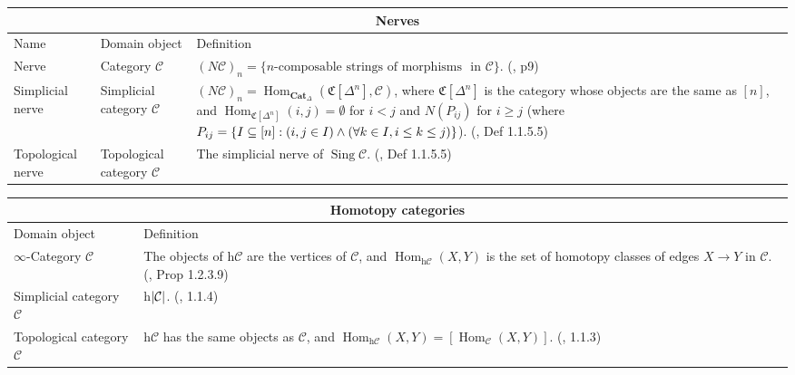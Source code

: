 \documentclass{article}
\DeclareMathOperator{\Hom}{Hom}
\DeclareMathOperator{\Sing}{Sing}
\def\subq{\ensuremath\subseteq}
\begin{document}
\begin{centre}
\begin{tabular}{ |p{3cm}||p{5cm}|p{7cm}|}
 \hline
 \multicolumn{3}{|c|}{Nerves}\\
 \hline
 Name& Domain object & Definition\\
  \hline\hline
  Nerve & Category \(\mathcal{C}\) & \((N\mathcal{C})_n=\text{\{}n\text{-composable strings of morphisms}\) \(\text{ in } \mathcal{C}\text{\}}\). (\autocite{htt}, p9) \\
 \hline
 Simplicial nerve & Simplicial category \(\mathcal{C}\) & \((N \mathcal{C})_n=\Hom_{\textbf{Cat}_\Delta}(\mathfrak{C}[\Delta^n], \mathcal{C})\), where \(\mathfrak{C}[\Delta^n]\) is the category whose objects are the same as \([n]\), and \(\Hom_{\mathfrak{C}[\Delta^n]}(i,j)=\emptyset\) for \(i<j\) and \(N(P_{ij})\) for \(i\geq j\) (where \(P_{ij}=\{I \subq [n] : (i, j \in I)\wedge (\forall k \in I, i \leq k \leq j)\}\)). (\autocite{htt}, Def 1.1.5.5)\\
 \hline
 Topological nerve & Topological category \(\mathcal{C}\) & The simplicial nerve of \(\Sing \mathcal{C}\). (\autocite{htt}, Def 1.1.5.5)\\
 \hline
\end{tabular}

\text{}

\text{}

\begin{tabular}{ |p{5cm}||p{8cm}|}
 \hline
 \multicolumn{2}{|c|}{Homotopy categories}\\
 \hline
 Domain object & Definition\\
  \hline\hline
  \(\infty\)-Category \(\mathcal{C}\) & The objects of h\(\mathcal{C}\) are the vertices of \(\mathcal{C}\), and \(\Hom_{\text{h}\mathcal{C}}(X,Y)\) is the set of homotopy classes of edges \(X\to Y\) in \(\mathcal{C}\). (\autocite{htt}, Prop 1.2.3.9)\\
  \hline
  Simplicial category \(\mathcal{C}\) & h\(\lvert\mathcal{C}\rvert\). (\autocite{htt}, 1.1.4) \\ 
 \hline
   Topological category \(\mathcal{C}\) & h\(\mathcal{C}\) has the same objects as \(\mathcal{C}\), and \(\Hom_{\text{h}\mathcal{C}}(X,Y)=[\Hom_\mathcal{C}(X,Y)]\). (\autocite{htt}, 1.1.3) \\
  \hline 
\end{tabular}

\text{}

\text{}


\end{centre}
\end{document}
